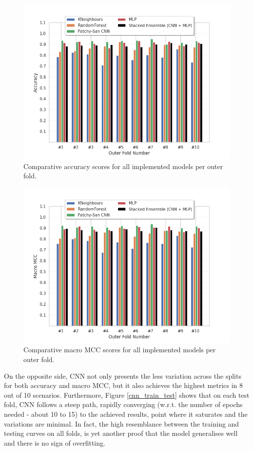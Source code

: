 \begin{figure}[H]
  \centering
  \centerline{\includegraphics[scale=0.6]{Images/acc_per_fold_new_cols.png}}
  \caption{Comparative accuracy scores for all implemented models per outer fold.}
  \label{acc_per_fold}
\end{figure}

\begin{figure}[H]
  \centering
  \centerline{\includegraphics[scale=0.6]{Images/macro_mcc_per_fold_new_cols.png}}
  \caption{Comparative macro MCC scores for all implemented models per outer fold.}
  \label{macro_mcc_per_fold}
\end{figure}

On the opposite side, CNN not only presents the less variation across the splits for both accuracy and macro MCC, but it also achieves the highest metrics in 8 out of 10 scenarios. Furthermore, Figure \ref{cnn_train_test} shows that on each test fold, CNN follows a steep path, rapidly converging (w.r.t. the number of epochs needed - about 10 to 15) to the achieved results, point where it saturates and the variations are minimal. In fact, the high resemblance between the training and testing curves on all folds, is yet another proof that the model generalises well and there is no sign of overfitting. \\

